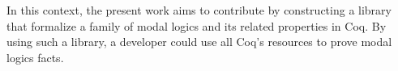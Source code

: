 \documentclass[sigconf,anonymous]{acmart}
\begin{document}
In this context, the present work aims to contribute by constructing a library
that formalize a family of modal logics and its related properties in Coq.
By using such a library, a developer could use all Coq's resources to prove
modal logics facts.




\end{document}
